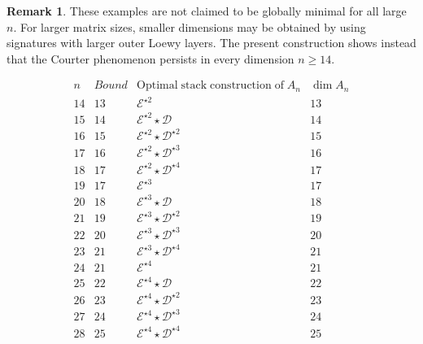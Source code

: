 \documentclass[11pt]{article}
\theoremstyle{remark}
\theoremstyle{plain}
\theoremstyle{definition}
\theoremstyle{myremark}
\newtheorem{remark}{Remark}
\begin{document}
\begin{remark}
	These examples are not claimed to be globally minimal for all large
	\(n\). For larger matrix sizes, smaller dimensions may be obtained by
	using signatures with larger outer Loewy layers. The present construction
	shows instead that the Courter phenomenon persists in every dimension
	\(n\ge14\).
\end{remark}



\begin{table}
	\caption{
		Explicit stack constructions showing that Courter-like algebras exist
		in every dimension \(14\le n\le 28\). The constructions use the brick
		algebra \(\mathcal E\), the diagonal brick \(\mathcal D\).
	}
\[
\begin{array}{c|c|c|c}
	n &  Bound & \mathrm{Optimal\; stack\; construction\;of\;} A_n& \dim A_n \\
	\hline
	14 & 13 & \mathcal E^{\star 2} & 13\\
	15 & 14 & \mathcal E^{\star 2}\star \mathcal D & 14\\
	16 & 15 & \mathcal E^{\star 2}\star \mathcal D^{\star 2} & 15\\
	17 & 16 & \mathcal E^{\star 2}\star \mathcal D^{\star 3} & 16\\
	18 & 17 & \mathcal E^{\star 2}\star \mathcal D^{\star 4} & 17\\
	19 & 17 & \mathcal E^{\star 3} & 17\\
	20 & 18 & \mathcal E^{\star 3}\star \mathcal D & 18\\
	21 & 19 & \mathcal E^{\star 3}\star \mathcal D^{\star 2} & 19\\
	22 & 20 & \mathcal E^{\star 3}\star \mathcal D^{\star 3} & 20\\
	23 & 21 & \mathcal E^{\star 3}\star \mathcal D^{\star 4} & 21\\
	24 & 21 & \mathcal E^{\star 4} & 21\\
	25 & 22 & \mathcal E^{\star 4}\star \mathcal D & 22\\
	26 & 23 & \mathcal E^{\star 4}\star \mathcal D^{\star 2} & 23\\
	27 & 24 & \mathcal E^{\star 4}\star \mathcal D^{\star 3} & 24\\
	28 & 25 & \mathcal E^{\star 4}\star \mathcal D^{\star 4} & 25
\end{array}
\]\end{table}
\end{document}
